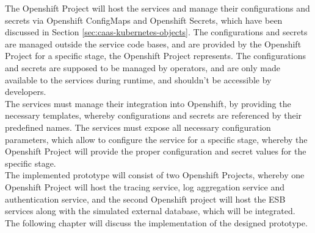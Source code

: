 The Openshift Project will host the services and manage their configurations and secrets via Openshift ConfigMaps and Openshift Secrets, which have been discussed in Section \vref{sec:caas-kubernetes-objects}. The configurations and secrets are managed outside the service code bases, and are provided by the Openshift Project for a specific stage, the Openshift Project represents. The configurations and secrets are supposed to be managed by operators, and are only made available to the services during runtime, and shouldn't be accessible by developers. \\

The services must manage their integration into Openshift, by providing the necessary templates, whereby configurations and secrets are referenced by their predefined names. The services must expose all necessary configuration parameters, which allow to configure the service for a specific stage, whereby the Openshift Project will provide the proper configuration and secret values for the specific stage. \\

The implemented prototype will consist of two Openshift Projects, whereby one Openshift Project will host the tracing service, log aggregation service and authentication service, and the second Openshift project will host the ESB services along with the simulated external database, which will be integrated. \\

The following chapter will discuss the implementation of the designed prototype. 
